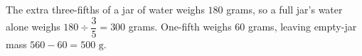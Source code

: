 The extra three-fifths of a jar of water weighs $180$ grams, so a full jar's water alone weighs $180\div\dfrac{3}{5}=300$ grams. One-fifth weighs $60$ grams, leaving empty-jar mass $560-60=\boxed{500\text{ g}}$.
